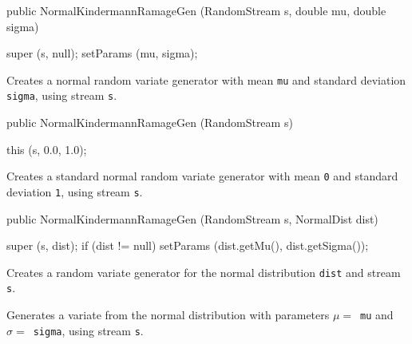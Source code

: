 \begin{code}

   public NormalKindermannRamageGen (RandomStream s,
                                     double mu, double sigma) \begin{hide} {
      super (s, null);
      setParams (mu, sigma);
   }\end{hide}
\end{code}
\begin{tabb}  Creates a normal random variate generator with mean \texttt{mu}
  and standard deviation \texttt{sigma}, using stream \texttt{s}.
\end{tabb}
\begin{code}

   public NormalKindermannRamageGen (RandomStream s) \begin{hide} {
      this (s, 0.0, 1.0);
   }\end{hide}
\end{code}
\begin{tabb}  Creates a standard normal random variate generator with mean
  \texttt{0} and standard deviation \texttt{1}, using stream \texttt{s}.
\end{tabb}
\begin{code}

   public NormalKindermannRamageGen (RandomStream s, NormalDist dist) \begin{hide} {
      super (s, dist);
      if (dist != null)
         setParams (dist.getMu(), dist.getSigma());
   }\end{hide}
\end{code}
 \begin{tabb} Creates a random variate generator for the normal distribution
  \texttt{dist} and stream \texttt{s}.
 \end{tabb}

 \begin{tabb}  Generates a variate from the normal distribution with
   parameters $\mu = $~\texttt{mu} and $\sigma = $~\texttt{sigma}, using
   stream \texttt{s}.
 \end{tabb}

